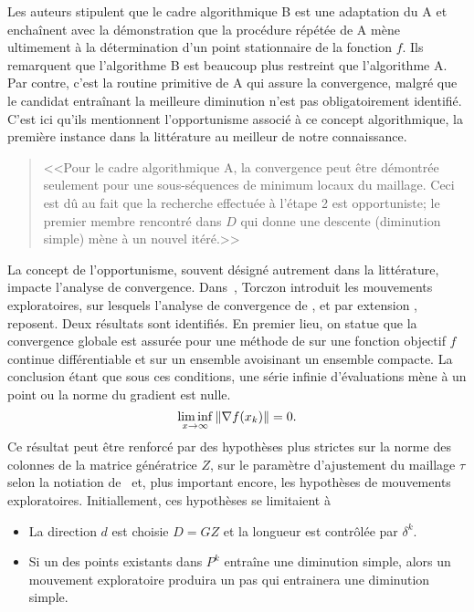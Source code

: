 Les auteurs stipulent que le cadre algorithmique B est une adaptation du A et enchaînent avec la démonstration que la procédure répétée de A mène ultimement à la détermination d'un point stationnaire de la fonction $f$. Ils remarquent que l'algorithme B est beaucoup plus restreint que l'algorithme A. Par contre, c'est la routine primitive de A qui assure la convergence, malgré que le candidat entraînant la meilleure diminution n'est pas obligatoirement identifié. C'est ici qu'ils mentionnent l'opportunisme associé à ce concept algorithmique, la première instance dans la littérature au meilleur de notre connaissance.
\begin{quote}
	<<Pour le cadre algorithmique A, la convergence peut être démontrée seulement pour une sous-séquences de minimum locaux du maillage. Ceci est dû au fait que la recherche effectuée à l'étape 2 est opportuniste; le premier membre rencontré dans $D$ qui donne une descente (diminution simple) mène à un nouvel itéré.>>
\end{quote}
La concept de l'opportunisme, souvent désigné autrement dans la littérature, impacte l'analyse de convergence. Dans~\cite{Torc97a}, Torczon introduit les mouvements exploratoires, sur lesquels l'analyse de convergence de \GPS, et par extension \CS, reposent. Deux résultats sont identifiés. En premier lieu, on statue que la convergence globale est assurée pour une méthode de \GPS sur une fonction objectif $f$ continue différentiable et sur un ensemble avoisinant un ensemble compacte. La conclusion étant que sous ces conditions, une série infinie d'évaluations mène à un point ou la norme du gradient est nulle.
\begin{equation}
	\label{eq:conv_gps}\liminf\limits_{x\rightarrow \infty}\left\lVert\nabla f(x_k)\right\rVert = 0.
\end{equation}
Ce résultat peut être renforcé par des hypothèses plus strictes sur la norme des colonnes de la matrice génératrice $Z$, sur le paramètre d'ajustement du maillage $\tau$ selon la notiation de~\cite{Torc97a} et, plus important encore, les hypothèses de mouvements exploratoires. Initiallement, ces hypothèses se limitaient à 
\begin{itemize}
	\item La direction $d$ est choisie $D=GZ$ et la longueur est contrôlée par $\delta^k$.
	\item Si un des points existants dans $P^k$ entraîne une diminution simple, alors un mouvement exploratoire produira un pas qui entrainera une diminution simple.
\end{itemize}
